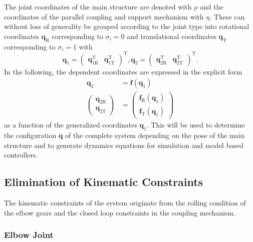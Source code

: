 \documentclass[letterpaper, 10 pt, conference]{ieeeconf}  %
\begin{document}
The joint coordinates of the main structure are denoted with $\rho$ and the coordinates of the parallel coupling and support mechanism with $\eta$.
%
%
These can without loss of generality be grouped according to the joint type into rotational coordinates $\bm{q}_{\mathrm{R}}$ corresponding to $\sigma_i=0$ and translational coordinates $\bm{q}_{\mathrm{T}}$ corresponding to $\sigma_i=1$ with
%
\begin{equation}
\bm{q}_1=\begin{pmatrix}\bm{q}_{1\mathrm{R}}^\mathrm{T} & \bm{q}_{1\mathrm{T}}^\mathrm{T} \end{pmatrix}^\mathrm{T},
\bm{q}_2=\begin{pmatrix}\bm{q}_{2\mathrm{R}}^\mathrm{T} & \bm{q}_{2\mathrm{T}}^\mathrm{T} \end{pmatrix}^\mathrm{T}.
\end{equation}
%
In the following, the dependent coordinates are expressed in the explicit form
%
\begin{align}
\bm{q}_2 &= \bm{f}(\bm{q}_1) \label{equ:kinconstr_explicit} \\
\begin{pmatrix}\bm{q}_{2\mathrm{R}}\\\bm{q}_{2\mathrm{T}}\end{pmatrix} &= \begin{pmatrix}\bm{f}_{\mathrm{R}}(\bm{q}_1)\\\bm{f}_{\mathrm{T}}(\bm{q}_1)\end{pmatrix}
\end{align}
%
as a function of the generalized coordinates $\bm{q}_1$.
This will be used to determine the configuration $\bm{q}$ of the complete system depending on the pose of the main structure and to generate dynamics equations for simulation and model based controllers.

\subsection{Elimination of Kinematic Constraints}

The kinematic constraints of the system originate from the rolling condition of the elbow gears and the closed loop constraints in the coupling mechanism.

\subsubsection{Elbow Joint}
\end{document}
